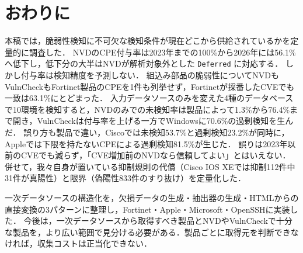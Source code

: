 \section{おわりに}

本稿では，脆弱性検知に不可欠な検知条件が現在どこから供給されているかを定量的に調査した．
NVDのCPE付与率は2023年までの100\%から2026年には56.1\%へ低下し，低下分の大半はNVDが解析対象外とした \texttt{Deferred} に対応する．
しかし付与率は検知精度を予測しない．
組込み部品の脆弱性についてNVDもVulnCheckもFortinet製品のCPEを1件も列挙せず，Fortinetが採番したCVEでも一致は63.1\%にとどまった．
入力データソースのみを変えた4種のデータベースで10環境を検知すると，NVDのみでの未検知率は製品によって1.3\%から76.4\%まで開き，VulnCheckは付与率を上げる一方でWindowsに70.6\%の過剰検知を生んだ．
誤り方も製品で違い，Ciscoでは未検知53.7\%と過剰検知23.2\%が同時に，Appleでは下限を持たないCPEによる過剰検知81.5\%が生じた．
誤りは2023年以前のCVEでも減らず，「CVE増加前のNVDなら信頼してよい」とはいえない．
併せて，我々自身が置いている抑制規則の代償（Cisco IOS XEでは抑制112件中31件が真陽性）と限界（偽陽性833件のすり抜け）を定量化した．

一次データソースの構造化を，欠損データの生成・抽出器の生成・HTMLからの直接変換の3パターンに整理し，Fortinet・Apple・Microsoft・OpenSSHに実装した．
今後は，一次データソースから取得すべき製品とNVDやVulnCheckで十分な製品を，より広い範囲で見分ける必要がある．製品ごとに取得元を判断できなければ，収集コストは正当化できない．
